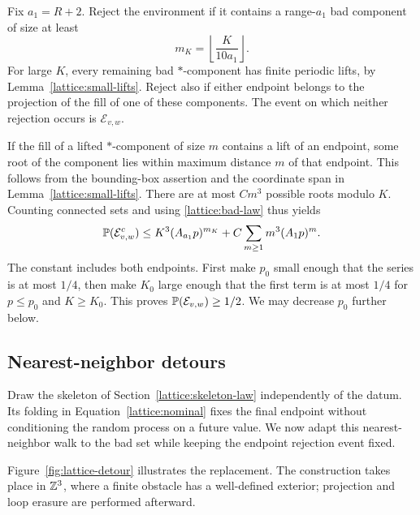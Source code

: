 Fix $a_1=R+2$.  Reject the environment if it contains a range-$a_1$
bad component of size at least
\[
 m_K=\left\lfloor\frac{K}{10a_1}\right\rfloor.
\]
For large $K$, every remaining bad $*$-component has finite periodic
lifts, by Lemma~\ref{lattice:small-lifts}.  Reject also if either endpoint
belongs to the projection of the fill of one of these components.
The event on which neither rejection occurs is $\mathcal E_{v,w}$.

If the fill of a lifted $*$-component of size $m$ contains a lift of
an endpoint, some root of the component lies within maximum distance
$m$ of that endpoint.  This follows from the bounding-box assertion
and the coordinate span in Lemma~\ref{lattice:small-lifts}.  There are at
most $C m^3$ possible roots modulo $K$.  Counting connected sets and
using \eqref{lattice:bad-law} thus yields
\begin{equation}\label{lattice:rejection}
 \mathbb P(\mathcal E_{v,w}^{c})
 \le K^3(A_{a_1}p)^{m_K}
       +C\sum_{m\ge1}m^3(A_1p)^m.
\end{equation}
The constant includes both endpoints.  First make $p_0$ small enough
that the series is at most $1/4$, then make $K_0$ large enough that
the first term is at most $1/4$ for $p\le p_0$ and $K\ge K_0$.
This proves $\mathbb P(\mathcal E_{v,w})\ge1/2$.  We may decrease $p_0$
further below.

\subsection{Nearest-neighbor detours}

Draw the skeleton of Section~\ref{lattice:skeleton-law} independently of the
datum. Its folding in Equation~\eqref{lattice:nominal} fixes the final endpoint
without conditioning the random process on a future value. We now adapt
this nearest-neighbor walk to the bad set while keeping the endpoint
rejection event fixed.

Figure~\ref{fig:lattice-detour} illustrates the replacement.  The
construction takes place in $\mathbb Z^3$, where a finite obstacle has a
well-defined exterior; projection and loop erasure are performed afterward.


